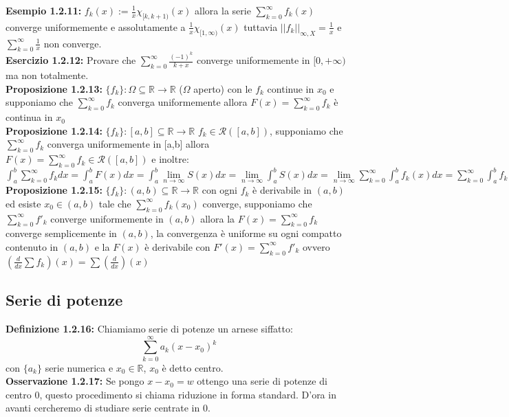 \documentclass[a4paper,11pt,titlepage]{book}
\begin{document}
\textbf{Esempio 1.2.11:} $f_k(x):=\frac{1}{x}\chi_{[k,k+1)}(x)$ allora la serie $\sum_{k=0}^{\infty} f_k(x)$ converge uniformemente e assolutamente a $\frac{1}{x}\chi_{[1,\infty)}(x)$ tuttavia $||f_k||_{\infty,X}=\frac{1}{x}$ e $\sum_{k=0}^{\infty}\frac{1}{x}$ non converge.\\

\textbf{Esercizio 1.2.12:} Provare che $\sum_{k=0}^{\infty}\frac{(-1)^k}{k+x}$ converge uniformemente in $[0,+\infty)$ ma non totalmente. \\

\textbf{Proposizione 1.2.13:}  $\{f_{k}\}:\Omega\subseteq\mathbb{R}\to\mathbb{R}$ ($\Omega$ aperto) con le $f_k$ continue in $x_0$ e supponiamo che $\sum_{k=0}^\infty f_{k}$ converga uniformemente allora $F(x)=\sum_{k=0}^\infty f_{k}$ è continua in $x_0$\\

\textbf{Proposizione 1.2.14:}  $\{f_{k}\}:[a,b]\subseteq\mathbb{R}\to\mathbb{R}$ $f_k\in\mathcal{R}([a,b])$, supponiamo che $\sum_{k=0}^\infty f_{k}$ converga uniformemente in [a,b] allora $F(x)=\sum_{k=0}^\infty f_{k}\in\mathcal{R}([a,b])$ e inoltre: $\int_a^b\sum_{k=0}^\infty f_{k}dx=\int_a^bF(x)dx=\int_a^b\lim\limits_{n\to\infty}S(x)dx=\lim\limits_{n\to\infty}\int_a^b S(x)dx=\lim\limits_{n\to\infty}\sum_{k=0}^\infty\int_a^b f_k(x)dx=\sum_{k=0}^\infty\int_a^b f_k(x)dx$ \\

\textbf{Proposizione 1.2.15:} $\{f_{k}\}:(a,b)\subseteq\mathbb{R}\to\mathbb{R}$ con ogni $f_k$  è derivabile in $(a,b)$ ed esiste $x_0\in (a,b)$ tale che $\sum_{k=0}^\infty f_{k}(x_0)$ converge, supponiamo che $\sum_{k=0}^\infty f'_{k}$ converge uniformemente in $(a,b)$ allora la $F(x)=\sum_{k=0}^\infty f_{k}$ converge semplicemente in $(a,b)$, la convergenza è uniforme su ogni compatto contenuto in $(a,b)$ e la $F(x)$ è derivabile con $F'(x)=\sum_{k=0}^\infty f'_{k}$ ovvero $(\frac{d}{dx}\sum f_k)(x)=\sum(\frac{d}{dx})(x)$

\subsection{Serie di potenze}

\textbf{Definizione 1.2.16:} Chiamiamo serie di potenze un arnese siffatto: $$\sum_{k=0}^{\infty}a_k(x-x_0)^k$$ con $\{a_k\}$ serie numerica e $x_0\in\mathbb{R}$, $x_0$ è detto centro. \\

\textbf{Osservazione 1.2.17:} Se pongo $x-x_0=w$ ottengo una serie di potenze di centro 0, questo procedimento si chiama riduzione in forma standard. D'ora in avanti cercheremo di studiare serie centrate in 0. \\
\end{document}
